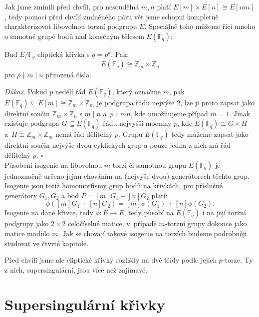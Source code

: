 \documentclass[12pt]{report}
\begin{document}
Jak jsme zmínili před chvíli, pro nesoudělná $m,n$ platí $E[m] \times E[n] \cong E[mn]$, tedy pomocí před chvílí zmíněného páru vět jsme schopni kompletně charakterizovat libovolnou torzní podgrupu $E$. Speciálně toho můžeme říci mnoho o samotné grupě bodů nad konečným tělesem $E(\mathbb{F}_q)$:

\begin{veta}
Buď $E/\mathbb{F}_q$ eliptická křivka s $q = p^k$. Pak:
\begin{equation*}
E(\mathbb{F}_q) \cong \mathbb{Z}_m \times \mathbb{Z}_n
\end{equation*}
pro $p \nmid m \mid n$ přirozená čísla.
\end{veta}
\noindent \textit{Důkaz.} Pokud $p$ nedělí řád $E(\mathbb{F}_q)$, který označme $m$, pak $E(\mathbb{F}_q) \subseteq E[m] \cong \mathbb{Z}_m \times \mathbb{Z}_m$ je podgrupa řádu nejvýše $2$, lze ji proto zapsat jako direktní součin $\mathbb{Z}_m \times \mathbb{Z}_n$ s $m \mid n$ a~$p \nmid mn$, kde umožňujeme případ $m=1$. Jinak existuje podgrupa $G \subseteq E(\mathbb{F}_q)$ řádu nejvyšší mocniny $p$, kde $E(\mathbb{F}_q) \cong G \times H$ a~$H \cong \mathbb{Z}_m \times \mathbb{Z}_m$ nemá řád dělitelný $p$. Grupu $E(\mathbb{F}_q)$ tedy můžeme zapsat jako direktní součin nejvýše dvou cyklických grup a pouze jedna z nich má řád dělitelný $p$. \hfill $\square$\\

Působení isogenie na libovolnou $m$-torzi či samotnou grupu $E(\mathbb{F}_q)$ je jednoznačně určeno jejím chováním na (nejvýše dvou) generátorech těchto grup. Isogenie jsou totiž homomorfismy grup bodů na křivkách, pro příslušné generátory $G_1,G_2$ a bod $P = [m] G_1 + [n] G_2$ platí:
\begin{equation*}
\phi([m]G_1+[n]G_2) = [m] \phi (G_1 )+ [n] \phi (G_2).
\end{equation*}
Isogenie na dané křivce, tedy $\phi : E \longrightarrow E$, tedy působí na $E(\mathbb{F}_q)$ i na její torzní podgrupy jako $2 \times 2$ celočíselné matice, v~případě $m$-torzní grupy dokonce jako matice modulo $m$. Jak se chovají takové isogenie na torzích budeme podrobněji studovat ve čtvrté kapitole.

Před chvíli jsme ale eliptické křivky rozlišily na dvě třídy podle jejich $p$-torze. Ty  z nich, supersingulární, jsou více než zajímavé.

\section{Supersingulární křivky}
\end{document}

